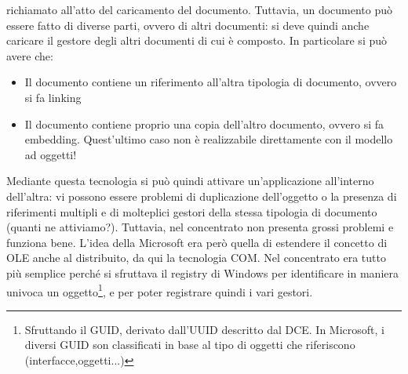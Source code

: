 richiamato all'atto del caricamento del documento.
Tuttavia, un documento può essere fatto di diverse parti, ovvero di altri documenti: si deve quindi anche caricare il
gestore degli altri documenti di cui è composto. In particolare si può avere che:
\begin{itemize}
 \item Il documento contiene un riferimento all'altra tipologia di documento, ovvero si fa linking
 \item Il documento contiene proprio una copia dell'altro documento, ovvero si fa embedding. Quest'ultimo caso non è
 realizzabile direttamente con il modello ad oggetti!
\end{itemize}
Mediante questa tecnologia si può quindi attivare un'applicazione all'interno dell'altra: vi possono essere problemi di
duplicazione dell'oggetto o la presenza di riferimenti multipli e di molteplici gestori della stessa tipologia di
documento (quanti ne attiviamo?). Tuttavia, nel concentrato non presenta grossi problemi e funziona bene.
L'idea della Microsoft era però quella di estendere il concetto di OLE anche al distribuito, da qui la tecnologia COM.
Nel concentrato era tutto più semplice perché si sfruttava il registry di Windows per identificare in maniera univoca un
oggetto\footnote{Sfruttando il GUID, derivato dall'UUID descritto dal DCE. In Microsoft, i diversi GUID son classificati
in base al tipo di oggetti che riferiscono (interfacce,oggetti...)}, e per poter registrare quindi i vari gestori.
